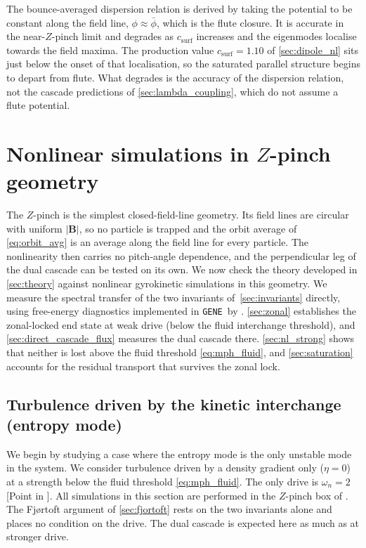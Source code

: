 \documentclass{jpp}
\newcommand{\bB}{\mathbf{B}}
\newcommand{\gene}{\texttt{GENE}}
\newcommand{\circled}[1]{\tikz[baseline=(char.base)]{\node[shape=circle,draw,inner sep=1.2pt,line width=0.4pt] (char) {\footnotesize #1};}}
\begin{document}
The bounce-averaged dispersion relation is derived by taking the potential to be constant along the field line, $\phi \approx \bar\phi$, which is the flute closure. It is accurate in the near-$Z$-pinch limit and degrades as $c_\mathrm{surf}$ increases and the eigenmodes localise towards the field maxima. The production value $c_\mathrm{surf} = 1.10$ of \cref{sec:dipole_nl} sits just below the onset of that localisation, so the saturated parallel structure begins to depart from flute. What degrades is the accuracy of the dispersion relation, not the cascade predictions of \cref{sec:lambda_coupling}, which do not assume a flute potential.


\section{Nonlinear simulations in $Z$-pinch geometry}\label{sec:nonlinear}

The $Z$-pinch is the simplest closed-field-line geometry. Its field lines are circular with uniform $|\bB|$, so no particle is trapped and the orbit average of \cref{eq:orbit_avg} is an average along the field line for every particle. The nonlinearity then carries no pitch-angle dependence, and the perpendicular leg of the dual cascade can be tested on its own. We now check the theory developed in \cref{sec:theory} against nonlinear gyrokinetic simulations in this geometry. We measure the spectral transfer of the two invariants of~\cref{sec:invariants} directly, using free-energy diagnostics implemented in \gene\ by \citet{BanonNavarro2016}. \cref{sec:zonal} establishes the zonal-locked end state at weak drive (below the fluid interchange threshold), and \cref{sec:direct_cascade_flux} measures the dual cascade there. \cref{sec:nl_strong} shows that neither is lost above the fluid threshold \cref{eq:mph_fluid}, and \cref{sec:saturation} accounts for the residual transport that survives the zonal lock.

\subsection{Turbulence driven by the kinetic interchange (entropy mode)}\label{sec:nl_weak}

We begin by studying a case where the entropy mode is the only unstable mode in the system. We consider turbulence driven by a density gradient only ($\eta=0$) at a strength below the fluid threshold \cref{eq:mph_fluid}. The only drive is $\omega_n = 2$ [Point \circled{A} in ]. All simulations in this section are performed in the $Z$-pinch box of . The Fj\o rtoft argument of \cref{sec:fjortoft} rests on the two invariants alone and places no condition on the drive. The dual cascade is expected here as much as at stronger drive.
\end{document}
